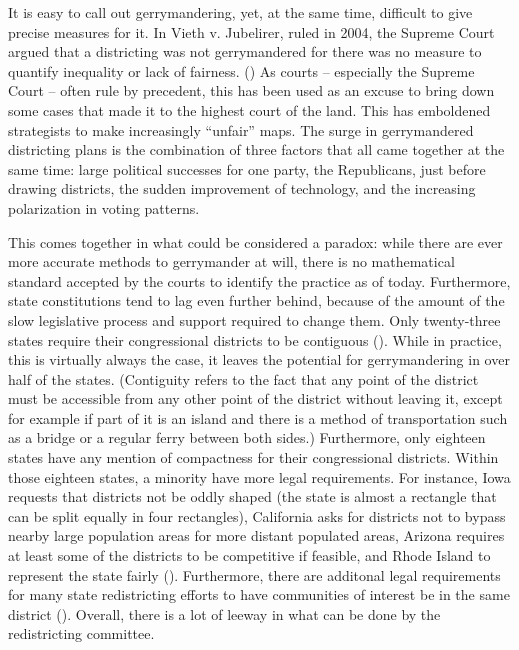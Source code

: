 \documentclass[letterpaper]{article}
\begin{document}
It is easy to call out gerrymandering, yet, at the same time, difficult to give precise measures for it. In Vieth v. Jubelirer, ruled in 2004, the Supreme Court argued that a districting was not gerrymandered for there was no measure to quantify inequality or lack of fairness. (\cite{vieth}) As courts – especially the Supreme Court – often rule by precedent, this has been used as an excuse to bring down some cases that made it to the highest court of the land. This has emboldened strategists to make increasingly “unfair” maps. The surge in gerrymandered districting plans is the combination of three factors that all came together at the same time: large political successes for one party, the Republicans, just before drawing districts, the sudden improvement of technology, and the increasing polarization in voting patterns.


This comes together in what could be considered a paradox: while there are ever more accurate methods to gerrymander at will, there is no mathematical standard accepted by the courts to identify the practice as of today. Furthermore, state constitutions tend to lag even further behind, because of the amount of the slow legislative process and support required to change them. Only twenty-three states require their congressional districts to be contiguous (\cite{contiguity}). While in practice, this is virtually always the case, it leaves the potential for gerrymandering in over half of the states. (Contiguity refers to the fact that any point of the district must be accessible from any other point of the district without leaving it, except for example if part of it is an island and there is a method of transportation such as a bridge or a regular ferry between both sides.) Furthermore, only eighteen states have any mention of compactness for their congressional districts. Within those eighteen states, a minority have more legal requirements. For instance, Iowa requests that districts not be oddly shaped (the state is almost a rectangle that can be split equally in four rectangles), California asks for districts not to bypass nearby large population areas for more distant populated areas, Arizona requires at least some of the districts to be competitive if feasible, and Rhode Island to represent the state fairly (\cite{contiguity}). Furthermore, there are additonal legal requirements for many state redistricting efforts to have communities of interest be in the same district (\cite{brennan}). Overall, there is a lot of leeway in what can be done by the redistricting committee. 
\end{document}
